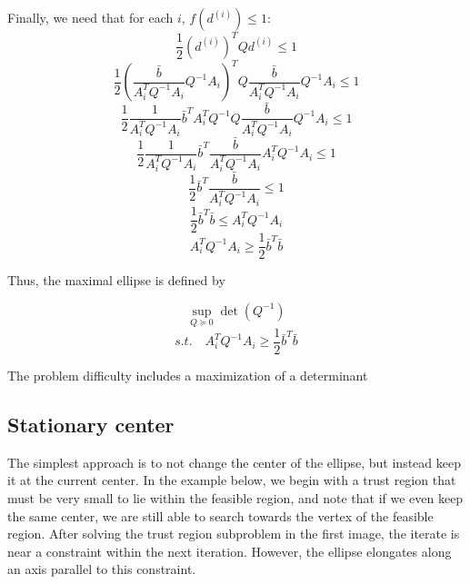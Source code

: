 \documentclass{article}
\begin{document}
Finally, we need that for each $i$, $f(d^{(i)}) \le 1$:
\[
\frac 1 2 (d^{(i)})^{T} Q d^{(i)} \le 1
\]
\[
\frac 1 2 (\frac {\bar{b}}{A_i^T  Q^{-1}A_i}  Q^{-1}A_i)^{T} Q \frac {\bar{b}}{A_i^T  Q^{-1}A_i}  Q^{-1}A_i \le 1
\]
\[
\frac 1 2 \frac {1}{A_i^T  Q^{-1}A_i}  \bar{b}^T A_i^T Q^{-1} Q \frac {\bar{b}}{A_i^T  Q^{-1}A_i}  Q^{-1}A_i \le 1
\]
\[
\frac 1 2 \frac {1}{A_i^T  Q^{-1}A_i}  \bar{b}^T \frac {\bar{b}}{A_i^T  Q^{-1}A_i}  A_i^T Q^{-1}A_i \le 1
\]
\[
\frac 1 2 \bar{b}^T \frac {\bar{b}}{A_i^T  Q^{-1}A_i} \le 1
\]
\[
\frac 1 2 \bar{b}^T \bar{b}\le A_i^T  Q^{-1}A_i
\]
\[
A_i^T  Q^{-1}A_i \ge \frac 1 2 \bar{b}^T \bar{b}
\]

Thus, the maximal ellipse is defined by

\[
\sup_{Q \succeq 0} \det(Q^{-1})
\]
\[
s.t. \quad A_i^T Q^{-1} A_i \ge \frac 1 2 \bar{b}^T\bar{b}
\]


The problem difficulty includes a maximization of a determinant


\subsection{Stationary center}
The simplest approach is to not change the center of the ellipse, but instead keep it at the current center.
In the example below, we begin with a trust region that must be very small to lie within the feasible region, and note that if we even keep the same center, we are still able to search towards the vertex of the feasible region.
After solving the trust region subproblem in the first image, the iterate is near a constraint within the next iteration.
However, the ellipse elongates along an axis parallel to this constraint.
\end{document}
